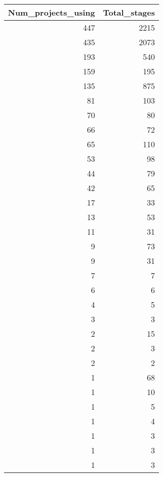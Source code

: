 \begin{tabular}{rr}
\toprule
 Num\_projects\_using &  Total\_stages \\
\midrule
                447 &          2215 \\
                435 &          2073 \\
                193 &           540 \\
                159 &           195 \\
                135 &           875 \\
                 81 &           103 \\
                 70 &            80 \\
                 66 &            72 \\
                 65 &           110 \\
                 53 &            98 \\
                 44 &            79 \\
                 42 &            65 \\
                 17 &            33 \\
                 13 &            53 \\
                 11 &            31 \\
                  9 &            73 \\
                  9 &            31 \\
                  7 &             7 \\
                  6 &             6 \\
                  4 &             5 \\
                  3 &             3 \\
                  2 &            15 \\
                  2 &             3 \\
                  2 &             2 \\
                  1 &            68 \\
                  1 &            10 \\
                  1 &             5 \\
                  1 &             4 \\
                  1 &             3 \\
                  1 &             3 \\
                  1 &             3 \\

\end{tabular}
